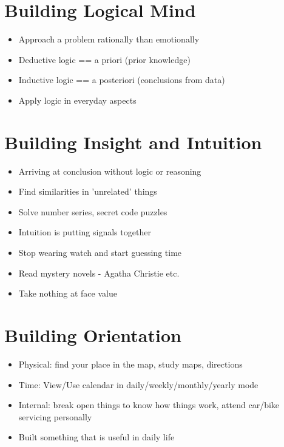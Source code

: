 \begin{multicols}{3}
\section{Building Logical Mind}
\begin{itemize}[noitemsep,nolistsep]
\item Approach a problem rationally than emotionally
\item Deductive logic == a priori (prior knowledge)
\item Inductive logic == a posteriori (conclusions from data)
\item Apply logic in everyday aspects
\end{itemize}

\section{Building Insight and Intuition}
\begin{itemize}[noitemsep,nolistsep]
\item Arriving at conclusion without logic or reasoning
\item Find similarities in 'unrelated' things
\item Solve number series, secret code puzzles
\item Intuition is putting signals together
\item Stop wearing watch and start guessing time
\item Read mystery novels - Agatha Christie etc.
\item Take nothing at face value
\end{itemize}

\section{Building Orientation}
\begin{itemize}[noitemsep,nolistsep]
\item Physical: find your place in the map, study maps, directions
\item Time: View/Use calendar in daily/weekly/monthly/yearly mode
\item Internal: break open things to know how things work, attend car/bike servicing personally
\item Built something that is useful in daily life
\end{itemize}


\end{multicols}
